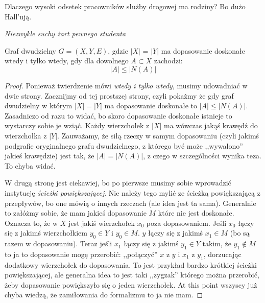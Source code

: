 \epigraph{Dlaczego wysoki odsetek pracowników służby drogowej ma rodziny? Bo dużo Hall'ują.}{\textit{Niezwykle suchy żart pewnego studenta}}
\begin{theorem}[Halla]
	Graf dwudzielny $G = (X,Y,E)$, gdzie $|X|$ = $|Y|$ ma dopasowanie doskonałe wtedy i tylko wtedy, gdy dla dowolnego $A \subset X$ zachodzi: \begin{equation}
		|A| \leq |N(A)|
	\end{equation}
\end{theorem}

\begin{proof}
	Ponieważ twierdzenie mówi \textit{wtedy i tylko wtedy}, musimy udowadniać w dwie strony. Zacznijmy od tej prostszej strony, czyli pokażmy że gdy graf dwudzielny w którym $|X| = |Y|$ ma dopasowanie doskonałe to $|A| \leq |N(A)|$. Zasadniczo od razu to widać, bo skoro dopasowanie doskonałe istnieje to wystarczy sobie je wziąć. Każdy wierzchołek z $|X|$ ma wówczas jakąś krawędź do wierzchołka z $|Y|$. Zauważamy, że siłą rzeczy w samym dopasowaniu (czyli jakimś podgrafie oryginalnego grafu dwudzielnego, z którego być może ,,wywalono'' jakieś krawędzie) jest tak, że $|A| = |N(A)|$, z czego w szczególności wynika teza. To chyba widać.

	W drugą stronę jest ciekawiej, bo po pierwsze musimy sobie wprowadzić instytucję \textit{ścieżki powiększającej}. Nie należy tego mylić ze ścieżką powiększającą z przepływów, bo one mówią o innych rzeczach (ale idea jest ta sama). Generalnie to załóżmy sobie, że mam jakieś dopasowanie $M$ które nie jest doskonałe. Oznacza to, że w $X$ jest jakiś wierzchołek $x_0$ poza dopasowaniem. Jeśli $x_0$ łączy się z jakimś wierzchołkiem $y_0 \in Y$ i $y_0 \in M$. $y$ łączy się z jakimś $x_1 \in M$ (bo są razem w dopasowaniu). Teraz jeśli $x_1$ łączy się z jakimś $y_1 \in Y$ takim, że $y_1 \not \in M$ to ja to dopasowanie mogę przerobić: ,,połączyć'' $x$ z $y$ i $x_1$ z $y_1$, dorzucając dodatkowy wierzchołek do dopasowania. To jest przykład bardzo krótkiej ścieżki powiększającej, ale generalna idea to jest taki ,,zygzak'' którego można przerobić, żeby dopasowanie powiększyło się o jeden wierzchołek. At this point wszyscy już chyba wiedzą, że zamiłowania do formalizmu to ja nie mam.


\end{proof}
